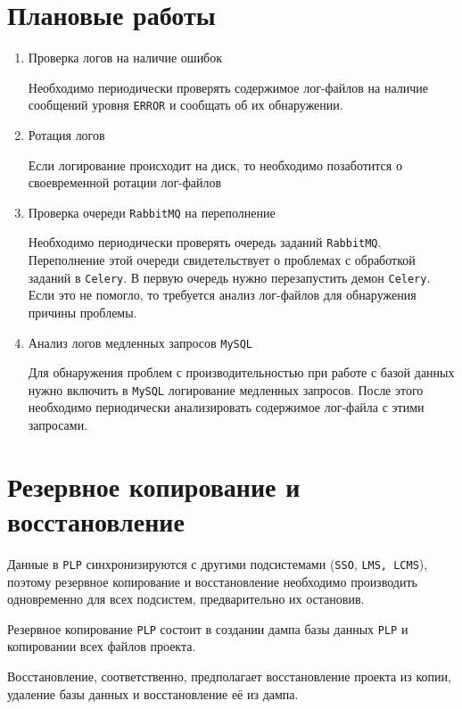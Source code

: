 \section{Плановые работы}
\begin{enumerate}
	\item Проверка логов на наличие ошибок
	
		Необходимо периодически проверять содержимое лог-файлов на наличие сообщений уровня \texttt{ERROR} и сообщать об их обнаружении.

	\item Ротация логов
	
		Если логирование происходит на диск, то необходимо позаботится о своевременной ротации лог-файлов
	
	\item Проверка очереди \texttt{RabbitMQ} на переполнение
	
		Необходимо периодически проверять очередь заданий \texttt{RabbitMQ}. Переполнение этой очереди свидетельствует о проблемах
		с обработкой заданий в \texttt{Celery}. В первую очередь нужно перезапустить демон \texttt{Celery}. Если это не помогло,
		то требуется анализ лог-файлов для обнаружения причины проблемы.
	
	\item Анализ логов медленных запросов \texttt{MySQL}
	
		Для обнаружения проблем с производительностью при работе с базой данных нужно включить в \texttt{MySQL} логирование медленных запросов.
		После этого необходимо периодически анализировать содержимое лог-файла с этими запросами.
\end{enumerate}

\section{Резервное копирование и восстановление}
Данные в \texttt{PLP} синхронизируются с другими подсистемами (\texttt{SSO}, \texttt{LMS, LCMS}), поэтому резервное копирование и восстановление
необходимо производить одновременно для всех подсистем, предварительно их остановив.

Резервное копирование \texttt{PLP} состоит в создании дампа базы данных \texttt{PLP} и копировании всех файлов проекта.

Восстановление, соответственно, предполагает восстановление проекта из копии, удаление базы данных и восстановление её из дампа.


